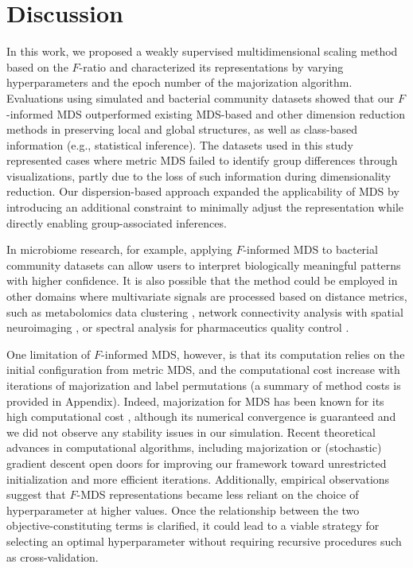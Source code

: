 \documentclass[10pt,letterpaper]{article}
\newcommand{\1}{{\rm 1}\kern-0.24em{\rm I}}
\begin{document}
\section*{Discussion}
In this work, we proposed a weakly supervised multidimensional scaling method based on the $F$-ratio and characterized its representations by varying hyperparameters and the epoch number of the majorization algorithm. Evaluations using simulated and bacterial community datasets showed that our $F$-informed MDS outperformed existing MDS-based and other dimension reduction methods in preserving local and global structures, as well as class-based information (e.g., statistical inference). The datasets used in this study represented cases where metric MDS failed to identify group differences through visualizations, partly due to the loss of such information during dimensionality reduction. Our dispersion-based approach expanded the applicability of MDS by introducing an additional constraint to minimally adjust the representation while directly enabling group-associated inferences.

In microbiome research, for example, applying $F$-informed MDS to bacterial community datasets can allow users to interpret biologically meaningful patterns with higher confidence. It is also possible that the method could be employed in other domains where multivariate signals are processed based on distance metrics, such as metabolomics data clustering \cite{Hansel25}, network connectivity analysis with spatial neuroimaging \cite{Kinsey24}, or spectral analysis for pharmaceutics quality control \cite{Puchert11}.

One limitation of $F$-informed MDS, however, is that its computation relies on the initial configuration from metric MDS, and the computational cost increase with iterations of majorization and label permutations (a summary of method costs is provided in  Appendix). Indeed, majorization for MDS has been known for its high computational cost \cite{Fang25}, although its numerical convergence is guaranteed \cite{deleeuw24} and we did not observe any stability issues in our simulation. Recent theoretical advances in computational algorithms, including majorization \cite{Streeter23} or (stochastic) gradient descent \cite{Demaine21, zheng19} open doors for improving our framework toward unrestricted initialization and more efficient iterations. Additionally, empirical observations suggest that $F$-MDS representations became less reliant on the choice of hyperparameter at higher values. Once the relationship between the two objective-constituting terms is clarified, it could lead to a viable strategy for selecting an optimal hyperparameter without requiring recursive procedures such as cross-validation.
\end{document}
